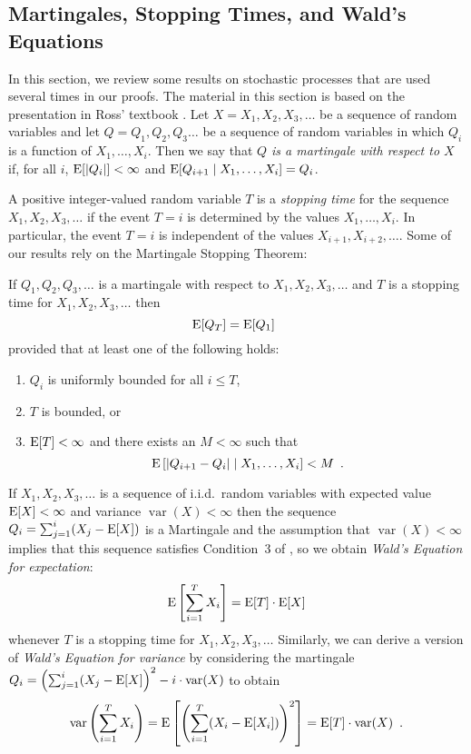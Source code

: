 \documentclass{patmorin}
\DeclareMathOperator{\var}{var}
\begin{document}
\subsection{Martingales, Stopping Times, and Wald's Equations}

In this section, we review some results on stochastic processes that
are used several times in our proofs.  The material in this section is
based on the presentation in Ross' textbook \cite[Chapter 6]{ross}.
Let $X=X_1,X_2,X_3,\ldots$ be a sequence of random variables and let
$Q=Q_1,Q_2,Q_3\ldots$ be a sequence of random variables in which $Q_i$
is a function of $X_1,\ldots,X_i$.  Then we say that \emph{$Q$ is a
martingale with respect to $X$} if, for all $i$, $\mathrm{E}[|Q_i|] < \infty$
and $\mathrm{E}[Q_{i+1}\mid X_1,\ldots,X_i] = Q_i$.

A positive integer-valued random variable $T$ is a \emph{stopping
time} for the sequence $X_1,X_2,X_3,\ldots$ if the event $T=i$ is
determined by the values $X_1,\ldots,X_i$.  In particular, the event
$T=i$ is independent of the values $X_{i+1},X_{i+2},\ldots$.  Some of
our results rely on the Martingale Stopping Theorem:

\begin{thm}
If $Q_1,Q_2,Q_3,\ldots$ is a martingale with respect to
$X_1,X_2,X_3,\ldots$ and $T$ is a stopping time for
$X_1,X_2,X_3,\ldots$ then
\[
   \mathrm{E}[Q_T] = \mathrm{E}[Q_1] \enspace 
\]
provided that at least one of the following holds:
\begin{enumerate}
\item $Q_i$ is uniformly bounded for all $i\le T$,
\item $T$ is bounded, or
\item $\mathrm{E}[T] < \infty$ and there exists an $M<\infty$ such that
\[ \mathrm{E}\left[|Q_{i+1}-Q_i| \mid X_1,\ldots,X_i \right] < M  \enspace . \]
\end{enumerate}
\end{thm}

If $X_1,X_2,X_3,\ldots$ is a sequence of i.i.d.\ random variables with
expected value $\mathrm{E}[X]<\infty$ and variance $\var(X)<\infty$ then 
the sequence $Q_i=\sum_{j=1}^i(X_j-\mathrm{E}[X])$ is a Martingale and the
assumption that $\var(X)<\infty$ implies that this sequence satisfies
Condition~3 of , so we obtain \emph{Wald's Equation
for expectation}:
\begin{equation}
    \E\left[\sum_{i=1}^T X_i \right] = \E[T]\cdot\E[X] \eqlabel{wald-1}
\end{equation}
whenever $T$ is a stopping time for $X_1,X_2,X_3,\ldots$  Similarly,
we can derive a version of \emph{Wald's Equation for variance} by considering 
the martingale 
$Q_i=\left(\sum_{j=1}^i (X_j-\E[X]\right)^2 - i\cdot\var(X)$ 
to obtain
\begin{equation}
    \var\left(\sum_{i=1}^T X_i\right) = \E\left[\left(\sum_{i=1}^T (X_i-\E[X_i])\right)^2 \right] =
\E[T]\cdot\var(X) \enspace . \eqlabel{wald-2}
\end{equation}
\end{document}

